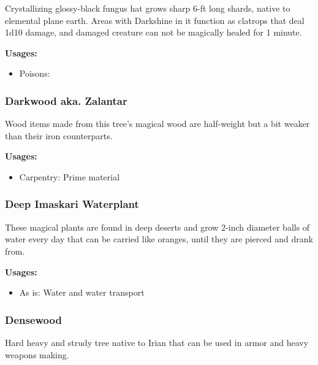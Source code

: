 Crystallizing glossy-black fungus hat grows sharp 6-ft long shards, native to elemental plane earth. Areas with Darkshine in it function as clatrops that deal 1d10 damage, and damaged creature can not be magically healed for 1 minute.

\vspace{5mm}

\textbf{Usages:}

\begin{itemize}[noitemsep]
\item[] Poisons: \poison\poison
\end{itemize}

\subsubsection{Darkwood aka. Zalantar}

Wood items made from this tree's magical wood are half-weight but a bit weaker than their iron counterparts.

\vspace{5mm}

\textbf{Usages:}

\begin{itemize}[noitemsep]
\item[] Carpentry: Prime material
\end{itemize}

\subsubsection{Deep Imaskari Waterplant}
\label{Deep Imaskari Waterplant}

These magical plants are found in deep deserts and grow 2-inch diameter balls of water every day that can be carried like oranges, until they are pierced and drank from.

\vspace{5mm}

\textbf{Usages:}

\begin{itemize}[noitemsep]
\item[] As is: Water and water transport
\end{itemize}

\subsubsection{Densewood}

Hard heavy and strudy tree native to Irian that can be used in armor and heavy weapons making.

